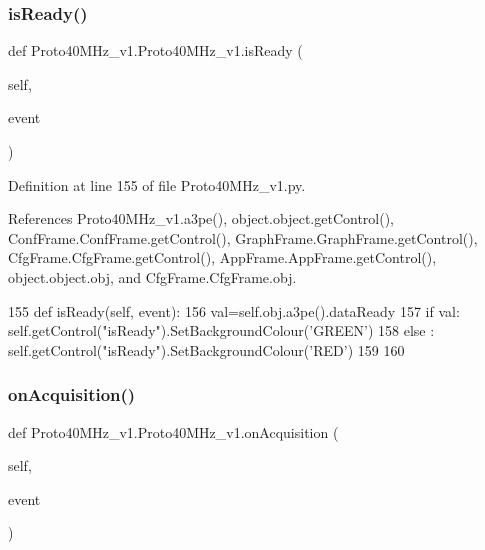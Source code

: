 \subsubsection{\texorpdfstring{is\+Ready()}{isReady()}}
{\footnotesize\ttfamily def Proto40\+M\+Hz\+\_\+v1.\+Proto40\+M\+Hz\+\_\+v1.\+is\+Ready (\begin{DoxyParamCaption}\item[{}]{self,  }\item[{}]{event }\end{DoxyParamCaption})}



Definition at line 155 of file Proto40\+M\+Hz\+\_\+v1.\+py.



References Proto40\+M\+Hz\+\_\+v1.\+a3pe(), object.\+object.\+get\+Control(), Conf\+Frame.\+Conf\+Frame.\+get\+Control(), Graph\+Frame.\+Graph\+Frame.\+get\+Control(), Cfg\+Frame.\+Cfg\+Frame.\+get\+Control(), App\+Frame.\+App\+Frame.\+get\+Control(), object.\+object.\+obj, and Cfg\+Frame.\+Cfg\+Frame.\+obj.


\begin{DoxyCode}
155     \textcolor{keyword}{def }isReady(self, event):
156         val=self.obj.a3pe().dataReady
157         \textcolor{keywordflow}{if} val: self.getControl(\textcolor{stringliteral}{"isReady"}).SetBackgroundColour(\textcolor{stringliteral}{'GREEN'})
158         \textcolor{keywordflow}{else} : self.getControl(\textcolor{stringliteral}{"isReady"}).SetBackgroundColour(\textcolor{stringliteral}{'RED'})
159   
160             
\end{DoxyCode}
\mbox{\label{classProto40MHz__v1_1_1Proto40MHz__v1_ad89c2823006ad921bcb9f1587797694e}} 
\subsubsection{\texorpdfstring{on\+Acquisition()}{onAcquisition()}}
{\footnotesize\ttfamily def Proto40\+M\+Hz\+\_\+v1.\+Proto40\+M\+Hz\+\_\+v1.\+on\+Acquisition (\begin{DoxyParamCaption}\item[{}]{self,  }\item[{}]{event }\end{DoxyParamCaption})}



